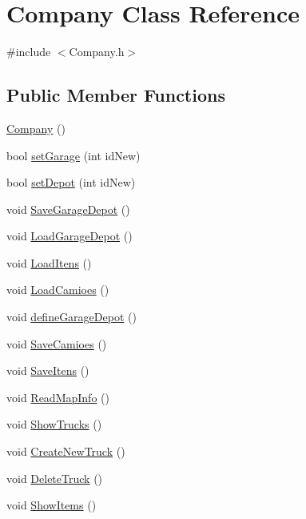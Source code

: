 \hypertarget{class_company}{}\section{Company Class Reference}
\label{class_company}


{\ttfamily \#include $<$Company.\+h$>$}

\subsection*{Public Member Functions}
\begin{DoxyCompactItemize}
\item 
\hyperlink{class_company_a29937dda711b09df306ae7ca9b3d6b42}{Company} ()
\item 
bool \hyperlink{class_company_aa2230e43804b9c0a170280024e2be2b5}{set\+Garage} (int id\+New)
\item 
bool \hyperlink{class_company_a3d9925f0b2be4d66aaa09dfca7675d2e}{set\+Depot} (int id\+New)
\item 
void \hyperlink{class_company_a892a266f60a3ebb48aabec485c8682ca}{Save\+Garage\+Depot} ()
\item 
void \hyperlink{class_company_a34305fee36acf01975783bf93cd32c83}{Load\+Garage\+Depot} ()
\item 
void \hyperlink{class_company_a9a50e7020198d93a208eb3ebac70d34c}{Load\+Itens} ()
\item 
void \hyperlink{class_company_a1d827f8eb6dc598fff62df4fadaf09e3}{Load\+Camioes} ()
\item 
void \hyperlink{class_company_a65dd697f6ebd631de1e9b4ddcd681a97}{define\+Garage\+Depot} ()
\item 
void \hyperlink{class_company_aac18c6ae288df51c87d25db2cc665b39}{Save\+Camioes} ()
\item 
void \hyperlink{class_company_a198f6b9ee4de842775c4819f22a45b43}{Save\+Itens} ()
\item 
void \hyperlink{class_company_a211481ef27f89e22960bc9fc820dde31}{Read\+Map\+Info} ()
\item 
void \hyperlink{class_company_a7464ae89c480c4df2a2d184c80923a39}{Show\+Trucks} ()
\item 
void \hyperlink{class_company_a271a395f425f118b47fab9fec33ffe95}{Create\+New\+Truck} ()
\item 
void \hyperlink{class_company_a92516e226d988ce58fd0f2c2f4d8734d}{Delete\+Truck} ()
\item 
void \hyperlink{class_company_a7df9ce7731ddba2b100bc1e4e76f45b8}{Show\+Items} ()

\end{DoxyCompactItemize}
